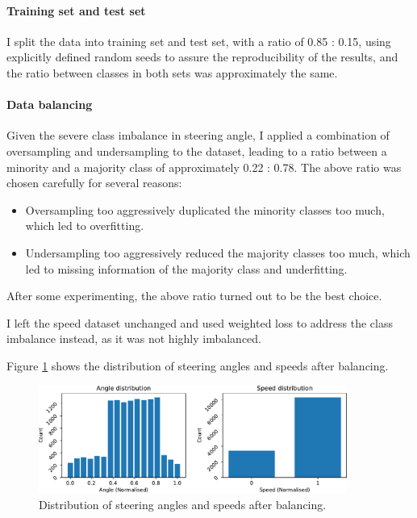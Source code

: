 \documentclass{article}
\begin{document}
\paragraph{Training set and test set}
I split the data into training set and test set, with a ratio of 0.85 : 0.15, using explicitly defined random seeds to assure the reproducibility of the results, and the ratio between classes in both sets was approximately the same.

\paragraph{Data balancing}
Given the severe class imbalance in steering angle, I applied a combination of oversampling and undersampling to the dataset, leading to a ratio between a minority and a majority class of approximately 0.22 : 0.78. The above ratio was chosen carefully for several reasons:
\begin{itemize}
  \item Oversampling too aggressively duplicated the minority classes too much, which led to overfitting.
  \item Undersampling too aggressively reduced the majority classes too much, which led to missing information of the majority class and underfitting.
\end{itemize}
After some experimenting, the above ratio turned out to be the best choice.

I left the speed dataset unchanged and used weighted loss to address the class imbalance instead, as it was not highly imbalanced.

Figure \ref{fig:angle_speed_distribution_balanced} shows the distribution of steering angles and speeds after balancing.

\begin{figure}[h]
  \centering
  \includegraphics[width=0.9\textwidth]{figures/angle_speed_distribution_balanced.pdf}
  \caption{Distribution of steering angles and speeds after balancing.}
  \label{fig:angle_speed_distribution_balanced}
\end{figure}
\end{document}
